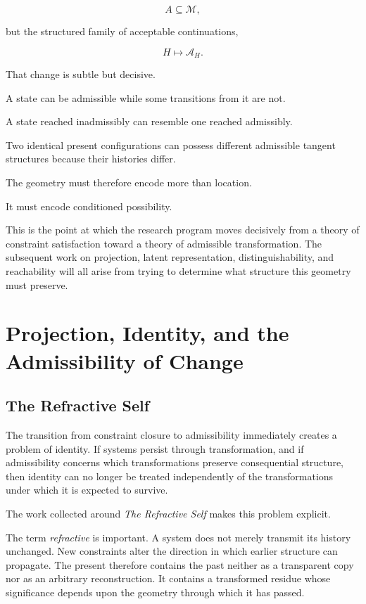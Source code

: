 \documentclass[11pt]{article}
\theoremstyle{remark}
\newcommand{\Adm}{\mathcal{A}}
\begin{document}
\begin{equation}
A\subseteq\mathcal{M},
\end{equation}

but the structured family of acceptable continuations,

\begin{equation}
H
\longmapsto
\Adm_H.
\end{equation}

That change is subtle but decisive.

A state can be admissible while some transitions from it are not.

A state reached inadmissibly can resemble one reached admissibly.

Two identical present configurations can possess different admissible tangent structures because their histories differ.

The geometry must therefore encode more than location.

It must encode conditioned possibility.

This is the point at which the research program moves decisively from a theory of constraint satisfaction toward a theory of admissible transformation. The subsequent work on projection, latent representation, distinguishability, and reachability will all arise from trying to determine what structure this geometry must preserve.

\section{Projection, Identity, and the Admissibility of Change}

\subsection{The Refractive Self}

The transition from constraint closure to admissibility immediately creates a problem of identity. If systems persist through transformation, and if admissibility concerns which transformations preserve consequential structure, then identity can no longer be treated independently of the transformations under which it is expected to survive.

The work collected around \emph{The Refractive Self} makes this problem explicit.

The term \emph{refractive} is important. A system does not merely transmit its history unchanged. New constraints alter the direction in which earlier structure can propagate. The present therefore contains the past neither as a transparent copy nor as an arbitrary reconstruction. It contains a transformed residue whose significance depends upon the geometry through which it has passed.
\end{document}
